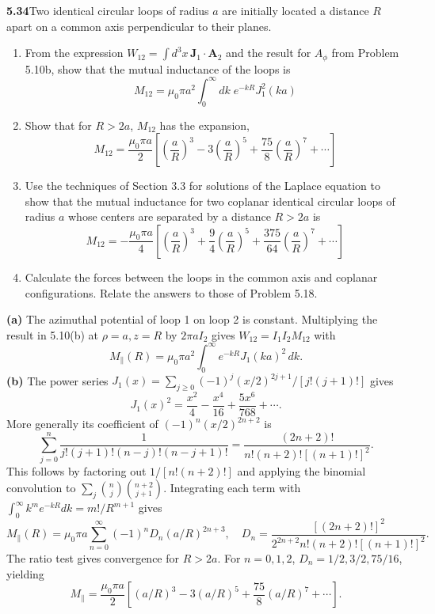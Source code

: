 \par\bigskip
\noindent\textbf{5.34}\quad Two identical circular loops of radius $a$ are initially located a distance $R$ apart on a common axis perpendicular to their planes.
\begin{enumerate}
\item[(a)] From the expression $W_{12}=\int d^{3}x\,\mathbf{J}_{1}\cdot\mathbf{A}_{2}$ and the result for $A_{\phi}$ from Problem 5.10b, show that the mutual inductance of the loops is
\[
M_{12}=\mu_{0}\pi a^{2}\int_{0}^{\infty}dk\;e^{-kR}J_{1}^{2}(ka)
\]
\item[(b)] Show that for $R>2a$, $M_{12}$ has the expansion,
\[
M_{12}=\frac{\mu_{0}\pi a}{2}\left[\left(\frac{a}{R}\right)^{3}-3\left(\frac{a}{R}\right)^{5}+\frac{75}{8}\left(\frac{a}{R}\right)^{7}+\cdots\right]
\]
\item[(c)] Use the techniques of Section 3.3 for solutions of the Laplace equation to show that the mutual inductance for two coplanar identical circular loops of radius $a$ whose centers are separated by a distance $R>2a$ is
\[
M_{12}=-\frac{\mu_{0}\pi a}{4}\left[\left(\frac{a}{R}\right)^{3}+\frac{9}{4}\left(\frac{a}{R}\right)^{5}+\frac{375}{64}\left(\frac{a}{R}\right)^{7}+\cdots\right]
\]
\item[(d)] Calculate the forces between the loops in the common axis and coplanar configurations. Relate the answers to those of Problem 5.18.
\end{enumerate}
\solution
\textbf{(a)} The azimuthal potential of loop 1 on loop 2 is constant.
Multiplying the result in 5.10(b) at $\rho=a,z=R$ by $2\pi aI_2$ gives
$W_{12}=I_1I_2M_{12}$ with
\[
\boxed{M_\parallel(R)=\mu_0\pi a^2
\int_0^\infty e^{-kR}J_1(ka)^2\,dk.}
\]
\textbf{(b)} The power series
$J_1(x)=\sum_{j\ge0}(-1)^j(x/2)^{2j+1}/[j!(j+1)!]$
gives
\[
J_1(x)^2=\frac{x^2}{4}-\frac{x^4}{16}
+\frac{5x^6}{768}+\cdots.
\]
More generally its coefficient of $(-1)^n(x/2)^{2n+2}$ is
\[
\sum_{j=0}^n\frac1{j!(j+1)!(n-j)!(n-j+1)!}
=\frac{(2n+2)!}{n!(n+2)![(n+1)!]^2}.
\]
This follows by factoring out $1/[n!(n+2)!]$ and applying the
binomial convolution to $\sum_j\binom nj\binom{n+2}{j+1}$.
Integrating each term with
$\int_0^\infty k^m e^{-kR}dk=m!/R^{m+1}$ gives
\[
M_\parallel(R)=\mu_0\pi a\sum_{n=0}^\infty
(-1)^nD_n(a/R)^{2n+3},
\quad
D_n=\frac{[(2n+2)!]^2}{2^{2n+2}n!(n+2)![(n+1)!]^2}.
\]
The ratio test gives convergence for $R>2a$.
For $n=0,1,2$, $D_n=1/2,3/2,75/16$, yielding
\[
\boxed{M_\parallel=\frac{\mu_0\pi a}{2}
\left[(a/R)^3-3(a/R)^5+\frac{75}{8}(a/R)^7+\cdots\right].}
\]
